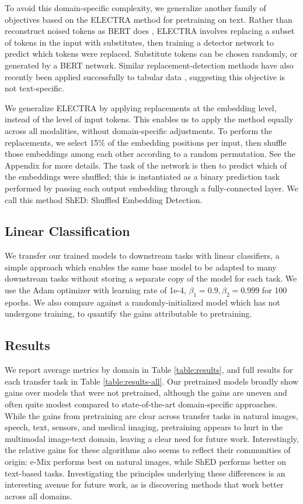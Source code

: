 \documentclass{article}
\begin{document}
To avoid this domain-specific complexity, we generalize another family of objectives based on the ELECTRA \citep{Clark2020ELECTRAPT} method for pretraining on text. Rather than reconstruct noised tokens as BERT does \citep{Devlin2019BERTPO}, ELECTRA involves replacing a subset of tokens in the input with substitutes, then training a detector network to predict which tokens were replaced. Substitute tokens can be chosen randomly, or generated by a BERT network. Similar replacement-detection methods have also recently been applied successfully to tabular data \citep{Iida2021TABBIEPR}, suggesting this objective is not text-specific.

We generalize ELECTRA by applying replacements at the embedding level, instead of the level of input tokens. This enables us to apply the method equally across all modalities, without domain-specific adjustments. To perform the replacements, we select 15\% of the embedding positions per input, then shuffle those embeddings among each other according to a random permutation. See the Appendix for more details. The task of the network is then to predict which of the embeddings were shuffled; this is instantiated as a binary prediction task performed by passing each output embedding through a fully-connected layer. We call this method ShED: Shuffled Embedding Detection.

\subsection{Linear Classification}

We transfer our trained models to downstream tasks with linear classifiers, a simple approach which enables the same base model to be adapted to many downstream tasks without storing a separate copy of the model for each task. We use the Adam optimizer \citep{kingma2014adam} with learning rate of 1e-4, $\beta_1 = 0.9, \beta_2 = 0.999$ for 100 epochs. We also compare against a randomly-initialized model which has not undergone training, to quantify the gains attributable to pretraining.

\subsection{Results}
We report average metrics by domain in Table \ref{table:results}, and full results for each transfer task in Table \ref{table:results-all}.  Our pretrained models broadly show gains over models that were not pretrained, although the gains are uneven and often quite modest compared to state-of-the-art domain-specific approaches. While the gains from pretraining are clear across transfer tasks in natural images, speech, text, sensors, and medical imaging, pretraining appears to hurt in the multimodal image-text domain, leaving a clear need for future work.  Interestingly, the relative gains for these algorithms also seems to reflect their communities of origin: e-Mix performs best on natural images, while ShED performs better on text-based tasks. Investigating the principles underlying these differences is an interesting avenue for future work, as is discovering methods that work better across all domains. 
\end{document}
